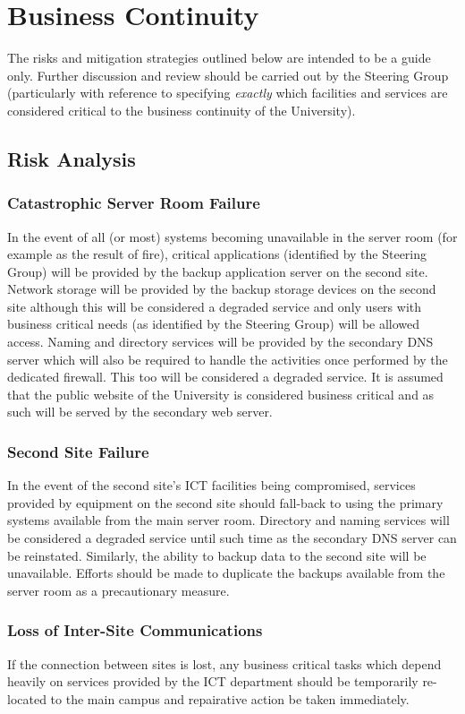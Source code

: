\documentclass[a4paper, twoside]{article}
\begin{document}
\section{Business Continuity}
The risks and mitigation strategies outlined below are intended to be a guide
only. Further discussion and review should be carried out by the Steering Group
(particularly with reference to specifying \emph{exactly} which facilities and
services are considered critical to the business continuity of the University).

\subsection{Risk Analysis}
\subsubsection{Catastrophic Server Room Failure}
In the event of all (or most) systems becoming unavailable in the server room
(for example as the result of fire), critical applications (identified by the
Steering Group) will be provided by the backup application server on the second
site. Network storage will be provided by the backup storage devices on the
second site although this will be considered a degraded service and only users
with business critical needs (as identified by the Steering Group) will be
allowed access. Naming and directory services will be provided by the secondary
DNS server which will also be required to handle the activities once performed
by the dedicated firewall. This too will be considered a degraded service. It is
assumed that the public website of the University is considered business
critical and as such will be served by the secondary web server.

\subsubsection{Second Site Failure}
In the event of the second site's ICT facilities being compromised, services
provided by equipment on the second site should fall-back to using the primary
systems available from the main server room. Directory and naming services will
be considered a degraded service until such time as the secondary DNS server can
be reinstated. Similarly, the ability to backup data to the second site will be
unavailable. Efforts should be made to duplicate the backups available from the
server room as a precautionary measure.

\subsubsection{Loss of Inter-Site Communications}
If the connection between sites is lost, any business critical tasks which
depend heavily on services provided by the ICT department should be temporarily
re-located to the main campus and repairative action be taken immediately.
\end{document}
